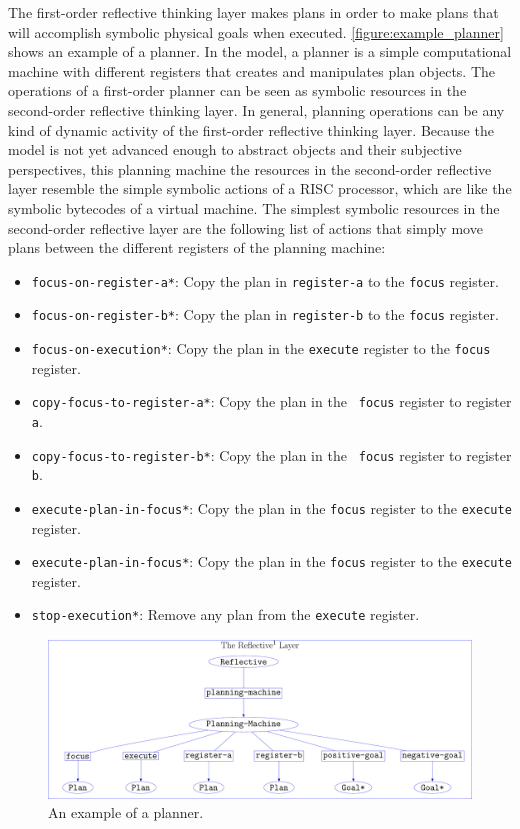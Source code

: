 The first-order reflective thinking layer makes plans in order to make
plans that will accomplish symbolic physical goals when executed.
{\mbox{\autoref{figure:example_planner}}} shows an example of a
planner.  In the model, a planner is a simple computational machine
with different registers that creates and manipulates plan objects.
The operations of a first-order planner can be seen as symbolic
resources in the second-order reflective thinking layer.  In general,
planning operations can be any kind of dynamic activity of the
first-order reflective thinking layer.  Because the model is not yet
advanced enough to abstract objects and their subjective perspectives,
this planning machine the resources in the second-order reflective
layer resemble the simple symbolic actions of a RISC processor, which
are like the symbolic bytecodes of a virtual machine.  The simplest
symbolic resources in the second-order reflective layer are the
following list of actions that simply move plans between the different
registers of the planning machine:
\begin{itemize}
\item {\tt focus-on-register-a*}: Copy the plan in {\tt register-a} to
  the {\tt focus} register.
\item {\tt focus-on-register-b*}: Copy the plan in {\tt register-b} to
  the {\tt focus} register.
\item {\tt focus-on-execution*}: Copy the plan in the {\tt execute}
  register to the {\tt focus} register.
\item {\tt copy-focus-to-register-a*}: Copy the plan in the {\tt
  focus} register to register {\tt a}.
\item {\tt copy-focus-to-register-b*}: Copy the plan in the {\tt
  focus} register to register {\tt b}.
\item {\tt execute-plan-in-focus*}: Copy the plan in the {\tt focus}
  register to the {\tt execute} register.
\item {\tt execute-plan-in-focus*}: Copy the plan in the {\tt focus}
  register to the {\tt execute} register.
\item {\tt stop-execution*}: Remove any plan from the {\tt execute}
  register.
\end{itemize}
\begin{figure}
\includegraphics[width=12cm]{gfx/example_planner}
\caption[An example of a planner.]{An example of a planner.}
\label{figure:example_planner}
\end{figure}
